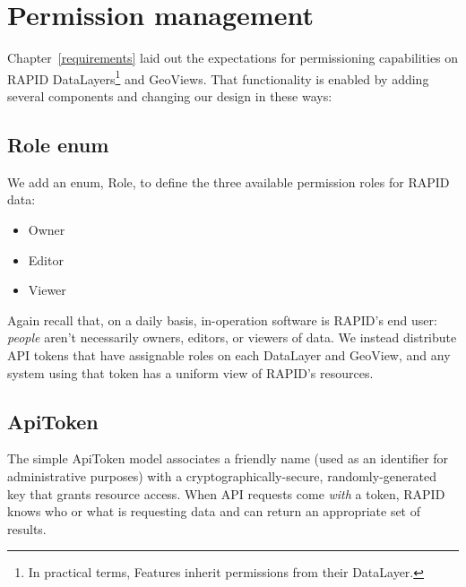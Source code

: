 




\section{Permission management}
Chapter~\ref{requirements} laid out the expectations for permissioning capabilities on RAPID DataLayers\footnote{In practical terms, Features inherit permissions from their DataLayer.} and GeoViews. That functionality is enabled by adding several components and changing our design in these ways:

\subsection{Role enum}
We add an enum, Role, to define the three available permission roles for RAPID data:
\begin{itemize}

  \item Owner
  \item Editor 
  \item Viewer
  \end{itemize}

Again recall that, on a daily basis, in-operation software is RAPID's end user: \textit{people} aren't necessarily owners, editors, or viewers of data. We instead distribute API tokens that have assignable roles on each DataLayer and GeoView, and any system using that token has a uniform view of RAPID's resources.

\subsection{ApiToken}
The simple ApiToken model associates a friendly name (used as an identifier for administrative purposes) with a cryptographically-secure, randomly-generated key that grants resource access. When API requests come \textit{with} a token, RAPID knows who or what is requesting data and can return an appropriate set of results.

